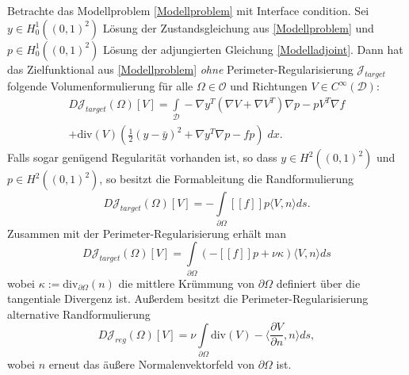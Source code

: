 \begin{theorem}
	Betrachte das Modellproblem \ref{Modellproblem} mit Interface condition. Sei $y\in H^1_0((0,1)^2)$ Lösung der Zustandsgleichung aus \ref{Modellproblem} und $p\in H^1_0((0,1)^2)$ Lösung der adjungierten Gleichung \ref{Modelladjoint}. Dann hat das Zielfunktional aus \ref{Modellproblem} \textit{ohne} Perimeter-Regularisierung $\mathcal{J}_{target}$ folgende Volumenformulierung für alle $\Omega \in \mathcal{O}$ und Richtungen $V \in C^\infty(\mathcal{D})$:
	\begin{equation}\label{shapederivvolume}
	\begin{aligned}
		D\mathcal{J}_{target}(\Omega)[V] = \underset{\mathcal{D}}{\int} -\nabla y^T (\nabla V + \nabla V^T) \nabla p - p V^T \nabla f \\ + \text{div} (V) \left(\frac{1}{2}(y-\bar{y})^2 + \nabla y^T \nabla p - fp\right)\; dx.
	\end{aligned}
	\end{equation}
	Falls sogar genügend Regularität vorhanden ist, so dass $y \in H^2((0,1)^2)$ und $p \in H^2((0,1)^2)$, so besitzt die Formableitung die Randformulierung
	\begin{equation}\label{shaperderivsurfacetarget}
	D\mathcal{J}_{target}(\Omega)[V] = -\underset{\partial\Omega}{\int} [[f]]p \langle V,n \rangle ds.
	\end{equation}
	Zusammen mit der Perimeter-Regularisierung erhält man
	\begin{equation}
	D\mathcal{J}_{target}(\Omega)[V] = \underset{\partial\Omega}{\int} (-[[f]]p  + \nu\kappa )\langle V,n \rangle ds 
	\end{equation}
	wobei $\kappa := \text{div}_{\partial\Omega}(n)$ die mittlere Krümmung von $\partial\Omega$ definiert über die tangentiale Divergenz ist. Außerdem besitzt die Perimeter-Regularisierung alternative  Randformulierung
	\begin{equation}\label{shapederivsurfaceperimeter}
	D\mathcal{J}_{reg}(\Omega)[V] = \nu\underset{\partial\Omega}{\int} \text{div}(V) - \langle\frac{\partial V}{\partial n}, n\rangle ds,
	\end{equation}
	wobei $n$ erneut das äußere Normalenvektorfeld von $\partial\Omega$ ist.
\end{theorem}


